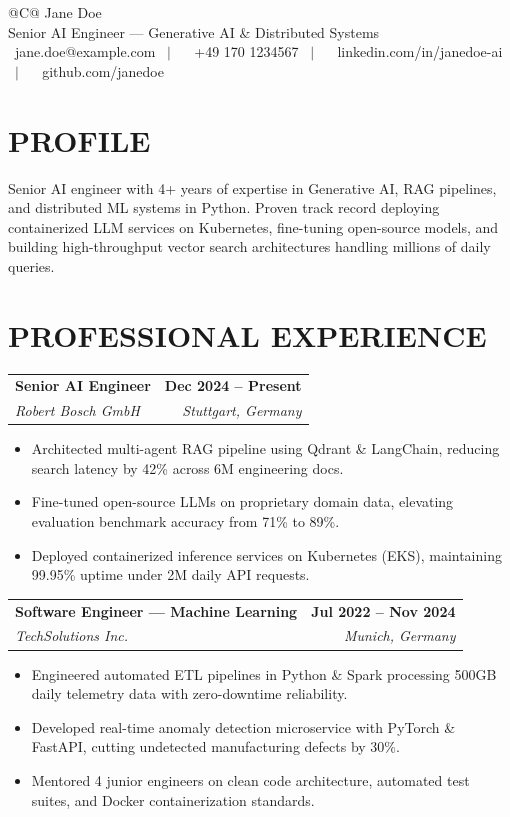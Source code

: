 \documentclass[a4paper,11pt]{article}
\makeatletter
\newcommand{\entryheader}[4]{%
  \begin{tabularx}{\textwidth}{@{}>{\RaggedRight\arraybackslash}X r@{}}
    \textbf{#1} & \textbf{#2} \\
    \textit{#3} & \textit{#4} \\
  \end{tabularx}%
}
\newenvironment{entrybullets}{%
  \begin{minipage}[t]{0.98\textwidth}
    \begin{itemize}[leftmargin=*,label=\textbullet,align=left]
}{%
    \end{itemize}
  \end{minipage}
}
\makeatother
\begin{document}
\pagestyle{empty}

\begin{tabularx}{\linewidth}{@{}C@{}}
  \Huge{Jane Doe}\\[8pt]
  \large{Senior AI Engineer — Generative AI \& Distributed Systems}\\[3pt]
  \raisebox{-0.05\height}{\faEnvelope} \ jane.doe@example.com \ $|$ \
  \raisebox{-0.05\height}{\faPhone} \ +49 170 1234567 \ $|$ \
  \raisebox{-0.05\height}{\faLinkedin} \ linkedin.com/in/janedoe-ai \ $|$ \
  \raisebox{-0.05\height}{\faGithub} \ github.com/janedoe
\end{tabularx}

\section*{PROFILE}
Senior AI engineer with 4+ years of expertise in Generative AI, RAG pipelines, and distributed ML systems in Python. Proven track record deploying containerized LLM services on Kubernetes, fine-tuning open-source models, and building high-throughput vector search architectures handling millions of daily queries.

\section*{PROFESSIONAL EXPERIENCE}
\entryheader{Senior AI Engineer}{Dec 2024 -- Present}{Robert Bosch GmbH}{Stuttgart, Germany}
\begin{entrybullets}
  \item Architected multi-agent RAG pipeline using Qdrant \& LangChain, reducing search latency by 42\% across 6M engineering docs.
  \item Fine-tuned open-source LLMs on proprietary domain data, elevating evaluation benchmark accuracy from 71\% to 89\%.
  \item Deployed containerized inference services on Kubernetes (EKS), maintaining 99.95\% uptime under 2M daily API requests.
\end{entrybullets}

\vspace{0.2cm}
\entryheader{Software Engineer — Machine Learning}{Jul 2022 -- Nov 2024}{TechSolutions Inc.}{Munich, Germany}
\begin{entrybullets}
  \item Engineered automated ETL pipelines in Python \& Spark processing 500GB daily telemetry data with zero-downtime reliability.
  \item Developed real-time anomaly detection microservice with PyTorch \& FastAPI, cutting undetected manufacturing defects by 30\%.
  \item Mentored 4 junior engineers on clean code architecture, automated test suites, and Docker containerization standards.
\end{entrybullets}
\end{document}
